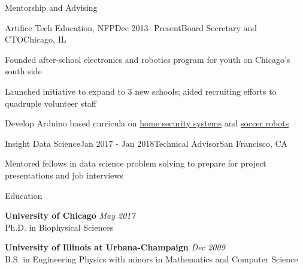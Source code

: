 \documentclass{resume} %
\begin{document}

\begin{rSection}{Mentorship and Advising}


\begin{rSubsection}{Artifice Tech Education, NFP}{Dec 2013- Present}{Board Secretary and CTO}{Chicago, IL}
	\item Founded after-school electronics and robotics program for youth on Chicago's south side
	\item Launched initiative to expand to 3 new schools; aided recruiting efforts to quadruple volunteer staff
	\item Develop Arduino based curricula on \href{http://www.makeloft.org/2014/12/raser-curriculum.html}{home security systems} and \href{http://blog.artificechicago.org/2016/05/bluetooth-redbot-tutorial.html}{soccer robots}

\end{rSubsection}


\begin{rSubsection}{Insight Data Science}{Jan 2017 - Jan 2018}{Technical Advisor}{San Francisco, CA}
	\item Mentored fellows in data science problem solving to prepare for project presentations and job interviews
	
\end{rSubsection}




\end{rSection}





\begin{rSection}{Education}

{\bf University of Chicago} \hfill {\em May 2017} \\ 
Ph.D. in Biophysical Sciences

{\bf University of Illinois at Urbana-Champaign} \hfill {\em Dec 2009} \\ 
B.S. in Engineering Physics with minors in Mathematics and Computer Science 

\end{rSection}

\end{document}

